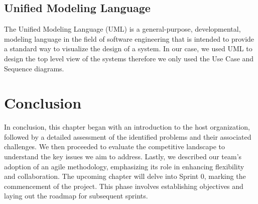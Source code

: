 \subsection{Unified Modeling Language}
The Unified Modeling Language (UML) is a general-purpose, developmental, modeling language in the field of software engineering that is intended to provide a standard way to visualize the design of a system. In our case, we used UML to design the top level view of the systems therefore we only used the Use Case and Sequence diagrams.

\setcounter{secnumdepth}{0} %
\section{Conclusion}
In conclusion, this chapter began with an introduction to the host organization, followed by a detailed assessment of the identified problems and their associated challenges. We then proceeded to evaluate the competitive landscape to understand the key issues we aim to address. Lastly, we described our team’s adoption of an agile methodology, emphasizing its role in enhancing flexibility and collaboration. The upcoming chapter will delve into Sprint 0, marking the commencement of the project. This phase involves establishing objectives and laying out the roadmap for subsequent sprints.
